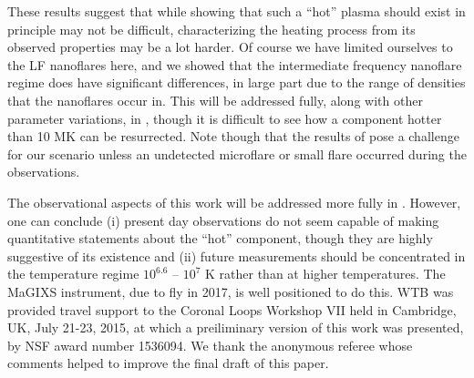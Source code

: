 \documentclass[iop]{emulateapj}
\begin{document}
	\par These results suggest that while showing that such a ``hot'' plasma should exist in principle may not be difficult, characterizing the heating process from its observed properties may be a lot harder. Of course we have limited ourselves to the LF nanoflares here, and we showed \citep{cargill_active_2014} that the intermediate frequency nanoflare regime does have significant differences, in large part due to the range of densities that the nanoflares occur in. This will be addressed fully, along with other parameter variations, in , though it is difficult to see how a component hotter than 10 MK can be resurrected. Note though that the results of \citet{caspi_new_2015} pose a challenge for our scenario unless an undetected microflare or small flare occurred during the observations.
	\par The observational aspects of this work will be addressed more fully in . However, one can conclude (i) present day observations do not seem capable of making quantitative statements about the ``hot'' component, though they are highly suggestive of its existence and (ii) future measurements should be concentrated in the temperature regime $10^{6.6}$ – $10^7$ K rather than at higher temperatures. The MaGIXS instrument, due to fly in 2017, is well positioned to do this.
\acknowledgments
WTB was provided travel support to the Coronal Loops Workshop
VII held in Cambridge, UK, July 21-23, 2015, at which a preiliminary version of this work was presented, by NSF award number 1536094. We thank the anonymous referee whose comments helped to improve the final draft of this paper.
	
	\appendix
\end{document}
